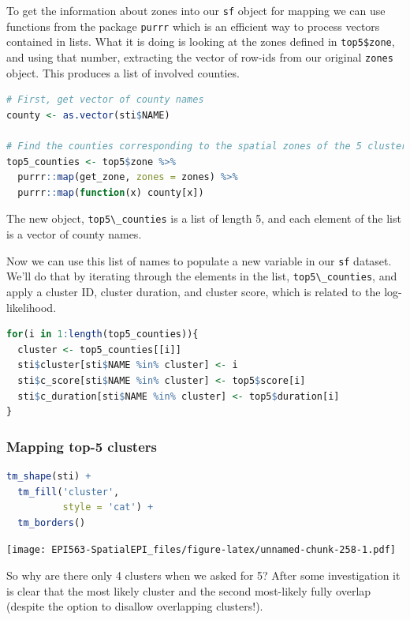 \documentclass[
]{book}
\newcommand{\passthrough}[1]{#1}
\begin{document}
To get the information about zones into our \passthrough{\lstinline!sf!} object for mapping we can use functions from the package \passthrough{\lstinline!purrr!} which is an efficient way to process vectors contained in lists. What it is doing is looking at the zones defined in \passthrough{\lstinline!top5$zone!}, and using that number, extracting the vector of row-ids from our original \passthrough{\lstinline!zones!} object. This produces a list of involved counties.

\begin{lstlisting}[language=R]
# First, get vector of county names
county <- as.vector(sti$NAME)

# Find the counties corresponding to the spatial zones of the 5 clusters.
top5_counties <- top5$zone %>%
  purrr::map(get_zone, zones = zones) %>%
  purrr::map(function(x) county[x])
\end{lstlisting}

The new object, \passthrough{\lstinline!top5\_counties!} is a list of length 5, and each element of the list is a vector of county names.

Now we can use this list of names to populate a new variable in our \passthrough{\lstinline!sf!} dataset. We'll do that by iterating through the elements in the list, \passthrough{\lstinline!top5\_counties!}, and apply a cluster ID, cluster duration, and cluster score, which is related to the log-likelihood.

\begin{lstlisting}[language=R]
for(i in 1:length(top5_counties)){
  cluster <- top5_counties[[i]]
  sti$cluster[sti$NAME %in% cluster] <- i
  sti$c_score[sti$NAME %in% cluster] <- top5$score[i]
  sti$c_duration[sti$NAME %in% cluster] <- top5$duration[i]
}
\end{lstlisting}

\hypertarget{mapping-top-5-clusters}{%
\subsubsection{Mapping top-5 clusters}\label{mapping-top-5-clusters}}

\begin{lstlisting}[language=R]
tm_shape(sti) + 
  tm_fill('cluster',
          style = 'cat') +
  tm_borders()
\end{lstlisting}

\texttt{[image: EPI563-SpatialEPI\_files/figure-latex/unnamed-chunk-258-1.pdf]}

So why are there only 4 clusters when we asked for 5? After some investigation it is clear that the most likely cluster and the second most-likely fully overlap (despite the option to disallow overlapping clusters!).
\end{document}
